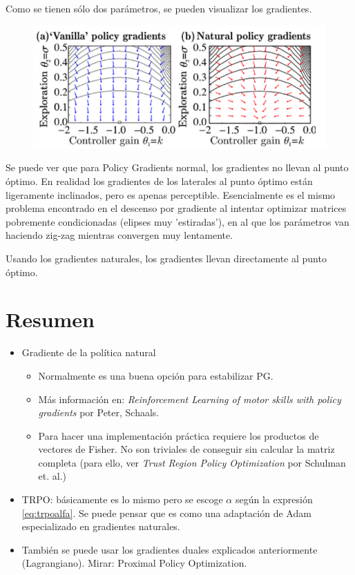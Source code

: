 Como se tienen sólo dos parámetros, se pueden visualizar los gradientes.

\begin{figure}[H]
	\centering
	\includegraphics[width=0.5\linewidth]{figures/2020-06-17-170705_666x280_scrot.png}
\end{figure}

Se puede ver que para Policy Gradients normal, los gradientes no llevan al punto óptimo. En
realidad los gradientes de los laterales al punto óptimo están ligeramente inclinados, pero es
apenas perceptible. Esencialmente es el mismo problema encontrado en el descenso por gradiente al
intentar optimizar matrices pobremente condicionadas (elipses muy 'estiradas'), en al que los
parámetros van haciendo zig-zag mientras convergen muy lentamente.

Usando los gradientes naturales, los gradientes llevan directamente al punto óptimo.

\section{Resumen}%
\label{sec:resumen}

\begin{itemize}
    \item Gradiente de la política natural
        \begin{itemize}
            \item Normalmente es una buena opción para estabilizar PG.
            \item Más información en: \textit{Reinforcement Learning of motor skills with
                policy gradients} por Peter, Schaals.
            \item Para hacer una implementación práctica requiere los productos de
                vectores de Fisher. No son triviales de conseguir sin calcular la matriz
                completa (para ello, ver \textit{Trust Region Policy Optimization} por
                Schulman et. al.)
        \end{itemize}
    \item TRPO: básicamente es lo mismo pero se escoge $\alpha$ según la expresión
        \ref{eq:trpoalfa}. Se puede pensar que es como una adaptación de Adam especializado
        en gradientes naturales.
    \item También se puede usar los gradientes duales explicados anteriormente
        (Lagrangiano). Mirar: Proximal Policy Optimization.
\end{itemize}
